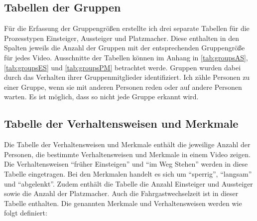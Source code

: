 \subsection{Tabellen der Gruppen}
Für die Erfassung der Gruppengrößen erstellte ich drei separate Tabellen für die Prozesstypen Einsteiger, Aussteiger und Platzmacher. Diese enthalten in den Spalten jeweils die Anzahl der Gruppen mit der entsprechenden Gruppengröße für jedes Video. Ausschnitte der Tabellen können im Anhang in \tablename \ref{tab:groupsAS}, \tablename \ref{tab:groupsES} und \tablename \ref{tab:groupsPM} betrachtet werde. Gruppen wurden dabei durch das Verhalten ihrer Gruppenmitglieder identifiziert. Ich zähle Personen zu einer Gruppe, wenn sie mit anderen Personen reden oder auf andere Personen warten. Es ist möglich, dass so nicht jede Gruppe erkannt wird.

\subsection{Tabelle der Verhaltensweisen und Merkmale}
Die Tabelle der Verhaltensweisen und Merkmale enthält die jeweilige Anzahl der Personen, die bestimmte Verhaltensweisen und Merkmale in einem Video zeigen. Die Verhaltensweisen "`früher Einsteigen"' und "`im Weg Stehen"' werden in diese Tabelle eingetragen. Bei den Merkmalen handelt es sich um "`sperrig"', "`langsam"' und "`abgelenkt"'. Zudem enthält die Tabelle die Anzahl Einsteiger und Aussteiger sowie die Anzahl der Platzmacher. Auch die Fahrgastwechselzeit ist in dieser Tabelle enthalten. Die genannten Merkmale und Verhaltensweisen werden wie folgt definiert:

